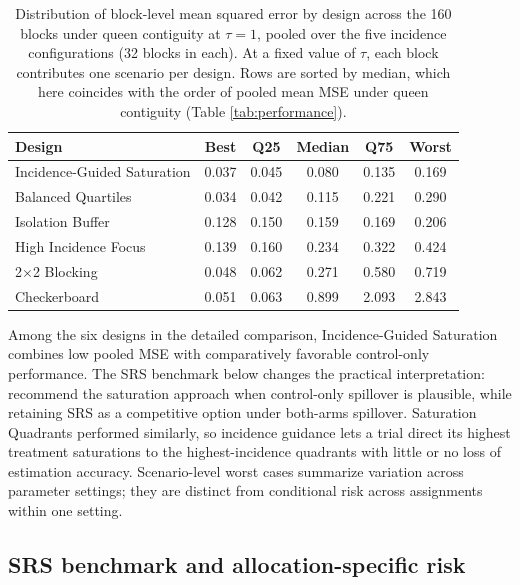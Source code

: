 \documentclass[11pt]{article}
\begin{document}
\begin{table}[!htb]

\small
\centering

\caption{Distribution of block-level mean squared error by design across the 160 blocks under queen contiguity at $\tau = 1$, pooled over the five incidence configurations (32 blocks in each). At a fixed value of $\tau$, each block contributes one scenario per design. Rows are sorted by median, which here coincides with the order of pooled mean MSE under queen contiguity (Table \ref{tab:performance}).}
\label{tab:robustness}

\begin{tabular}{lccccc}

\toprule
Design & Best & Q25 & Median & Q75 & Worst \\

\midrule
Incidence-Guided Saturation & 0.037 & 0.045 & 0.080 & 0.135 & 0.169 \\
Balanced Quartiles & 0.034 & 0.042 & 0.115 & 0.221 & 0.290 \\
Isolation Buffer & 0.128 & 0.150 & 0.159 & 0.169 & 0.206 \\
High Incidence Focus & 0.139 & 0.160 & 0.234 & 0.322 & 0.424 \\
2$\times$2 Blocking & 0.048 & 0.062 & 0.271 & 0.580 & 0.719 \\
Checkerboard & 0.051 & 0.063 & 0.899 & 2.093 & 2.843 \\

\bottomrule

\end{tabular}

\end{table}

Among the six designs in the detailed comparison, Incidence-Guided
Saturation combines low pooled MSE with comparatively favorable
control-only performance. The SRS benchmark below changes the practical
interpretation: recommend the saturation approach when control-only
spillover is plausible, while retaining SRS as a competitive option
under both-arms spillover. Saturation Quadrants performed similarly, so incidence guidance lets a trial direct its highest treatment saturations to the highest-incidence quadrants with little or no loss of estimation accuracy. Scenario-level worst cases summarize variation across
parameter settings; they are distinct from conditional risk across
assignments within one setting.

\subsection{SRS benchmark and allocation-specific
risk}\label{srs-benchmark-and-allocation-specific-risk}
\end{document}
